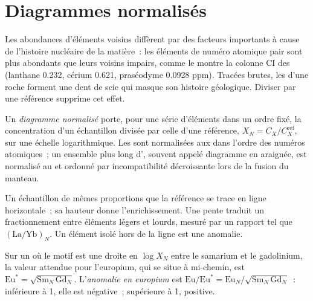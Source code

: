 \section{Diagrammes normalisés}

Les abondances d'éléments voisins diffèrent par des facteurs importants à cause de l'histoire
nucléaire de la matière~: les éléments de numéro atomique pair sont plus abondants que
leurs voisins impairs, comme le montre la colonne CI des  (lanthane 0.232, cérium
0.621, praséodyme 0.0928 ppm). Tracées brutes, les  d'une roche forment une dent
de scie qui masque son histoire géologique. Diviser par une référence supprime cet effet.

\begin{definition}\label{def:b2:elements-in-the-earth:normalised}
Un \emph{diagramme normalisé} porte, pour une série d'éléments
dans un ordre fixé, la concentration d'un échantillon divisée par celle d'une référence,
$X_N = C_X/C_X^{\mathrm{ref}}$, sur une échelle logarithmique. Les  sont
normalisées aux  dans l'ordre des numéros atomiques~; un ensemble plus
long d', souvent appelé diagramme en araignée, est normalisé au
 et ordonné par incompatibilité décroissante lors de la fusion du manteau.
\end{definition}

Un échantillon de mêmes proportions que la référence se trace en ligne
horizontale~; sa hauteur donne l'enrichissement. Une pente traduit un fractionnement
entre éléments légers et lourds, mesuré par un rapport tel que
$(\mathrm{La}/\mathrm{Yb})_N$. Un élément isolé hors de la ligne est une anomalie.

\begin{proposition}\label{prop:b2:elements-in-the-earth:normalised}
Sur un  où le motif est une droite en $\log X_N$ entre
le samarium et le gadolinium, la valeur attendue pour l'europium, qui
se situe à mi-chemin, est $\mathrm{Eu}^* = \sqrt{\mathrm{Sm}_N\,\mathrm{Gd}_N}$.
L'\emph{anomalie en europium} est
$\mathrm{Eu}/\mathrm{Eu}^* = \mathrm{Eu}_N/\sqrt{\mathrm{Sm}_N\,\mathrm{Gd}_N}$~:
inférieure à 1, elle est négative~; supérieure à 1, positive.
\end{proposition}

